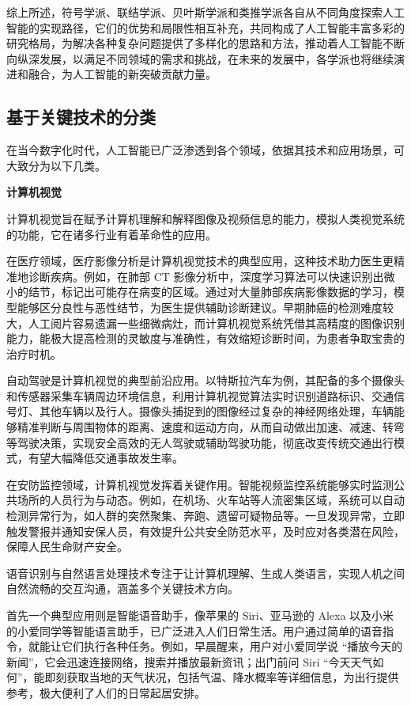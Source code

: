 综上所述，符号学派、联结学派、贝叶斯学派和类推学派各自从不同角度探索人工智能的实现路径，它们的优势和局限性相互补充，共同构成了人工智能丰富多彩的研究格局，为解决各种复杂问题提供了多样化的思路和方法，推动着人工智能不断向纵深发展，以满足不同领域的需求和挑战，在未来的发展中，各学派也将继续演进和融合，为人工智能的新突破贡献力量。

\subsection{基于关键技术的分类}


在当今数字化时代，人工智能已广泛渗透到各个领域，依据其技术和应用场景，可大致分为以下几类。


\textbf{计算机视觉}


计算机视觉旨在赋予计算机理解和解释图像及视频信息的能力，模拟人类视觉系统的功能，它在诸多行业有着革命性的应用。



在医疗领域，医疗影像分析是计算机视觉技术的典型应用，这种技术助力医生更精准地诊断疾病。例如，在肺部 CT 影像分析中，深度学习算法可以快速识别出微小的结节，标记出可能存在病变的区域。通过对大量肺部疾病影像数据的学习，模型能够区分良性与恶性结节，为医生提供辅助诊断建议。早期肺癌的检测难度较大，人工阅片容易遗漏一些细微病灶，而计算机视觉系统凭借其高精度的图像识别能力，能极大提高检测的灵敏度与准确性，有效缩短诊断时间，为患者争取宝贵的治疗时机。


自动驾驶是计算机视觉的典型前沿应用。以特斯拉汽车为例，其配备的多个摄像头和传感器采集车辆周边环境信息，利用计算机视觉算法实时识别道路标识、交通信号灯、其他车辆以及行人。摄像头捕捉到的图像经过复杂的神经网络处理，车辆能够精准判断与周围物体的距离、速度和运动方向，从而自动做出加速、减速、转弯等驾驶决策，实现安全高效的无人驾驶或辅助驾驶功能，彻底改变传统交通出行模式，有望大幅降低交通事故发生率。


在安防监控领域，计算机视觉发挥着关键作用。智能视频监控系统能够实时监测公共场所的人员行为与动态。例如，在机场、火车站等人流密集区域，系统可以自动检测异常行为，如人群的突然聚集、奔跑、遗留可疑物品等。一旦发现异常，立即触发警报并通知安保人员，有效提升公共安全防范水平，及时应对各类潜在风险，保障人民生命财产安全。


语音识别与自然语言处理技术专注于让计算机理解、生成人类语言，实现人机之间自然流畅的交互沟通，涵盖多个关键技术方向。


首先一个典型应用则是智能语音助手，像苹果的 Siri、亚马逊的 Alexa 以及小米的小爱同学等智能语言助手，已广泛进入人们日常生活。用户通过简单的语音指令，就能让它们执行各种任务。例如，早晨醒来，用户对小爱同学说 “播放今天的新闻”，它会迅速连接网络，搜索并播放最新资讯；出门前问 Siri “今天天气如何”，能即刻获取当地的天气状况，包括气温、降水概率等详细信息，为出行提供参考，极大便利了人们的日常起居安排。


